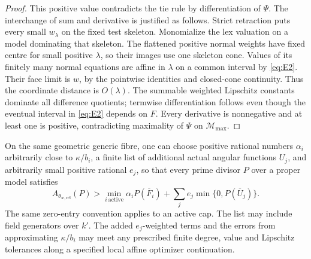 \begin{proof}
This positive value contradicts the tie rule by differentiation
of \(\Psi\).  The interchange of sum and derivative is justified
as follows.  Strict retraction puts every small \(w_\lambda\)
on the fixed test skeleton.  Monomialize the lex valuation on a
model dominating that skeleton.  The flattened positive normal
weights have fixed centre for small positive \(\lambda\), so
their images use one skeleton cone.  Values of its finitely
many normal equations are affine in \(\lambda\) on a common
interval by \eqref{eq:E2}.  Their face limit is \(w\), by the
pointwise identities and closed-cone continuity.  Thus the
coordinate distance is \(O(\lambda)\).  The summable weighted
Lipschitz constants dominate all difference quotients; termwise
differentiation follows even though the eventual interval in
\eqref{eq:E2} depends on \(F\).  Every derivative is nonnegative
and at least one is positive, contradicting maximality of
\(\Psi\) on \(\mathcal M_{\max}\).
\end{proof}

\begin{corollary}\label{c:strict-budget}
On the same geometric generic fibre, one can choose positive
rational numbers \(\alpha_i\) arbitrarily close to
\(\kappa/b_i\), a finite list of additional actual angular
functions \(U_j\), and arbitrarily small positive rational
\(e_j\), so that every prime divisor \(P\) over a proper model
satisfies
\begin{equation}\label{eq:E5}
 A_{\theta_{w,\mathrm{rel}}}(P)>
       \min_{i\ \mathrm{active}}\alpha_i P(\overline F_i)
            +\sum_j e_j\min\{0,P(\overline U_j)\}.
\end{equation}
The same zero-entry convention applies to an active cap.
The list may include field generators over \(k'\).
The added \(e_j\)-weighted terms and the errors from approximating
\(\kappa/b_i\) may meet any prescribed finite degree, value and
Lipschitz tolerances along a specified local affine optimizer
continuation.
\end{corollary}

